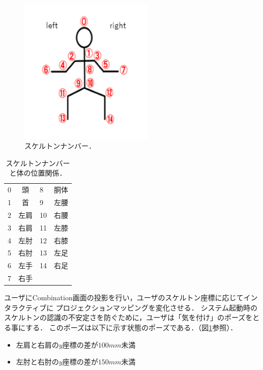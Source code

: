 \begin{figure}[htbp]
    \centering
    \includegraphics[height=7cm]{image/Skeleton_num.png}
    \caption[スケルトンナンバー]{スケルトンナンバー．}
  \label{num}
\end{figure}

\begin{table}[h]
    \centering
    \begin{tabular}{|lc|lc|} \hline
      0 & 頭 & 8 & 胴体 \\ 
      1 & 首 & 9 & 左腰 \\
      2 & 左肩 & 10 & 右腰 \\
      3 & 右肩 & 11 & 左膝 \\
      4 & 左肘 & 12 & 右膝 \\
      5 & 右肘 & 13 & 左足 \\
      6 & 左手 & 14 & 右足 \\
      7 & 右手 &  &  \\ \hline
    \end{tabular}
    \caption[スケルトンナンバーと体の位置関係]{スケルトンナンバーと体の位置関係．}
    \label{num}
\end{table}



ユーザにCombination画面の投影を行い，ユーザのスケルトン座標に応じてインタラクティブに
プロジェクションマッピングを変化させる\cite{busan}\cite{ijrte}．
システム起動時のスケルトンの認識の不安定さを防ぐために，ユーザは「気を付け」のポーズをとる事にする．
このポーズは以下に示す状態のポーズである．（図\ref{num}参照）．

\begin{itemize}
    \item 左肩と右肩の$y$座標の差が$100mm$未満
    \item 左肘と右肘の$y$座標の差が$150mm$未満
\end{itemize}

